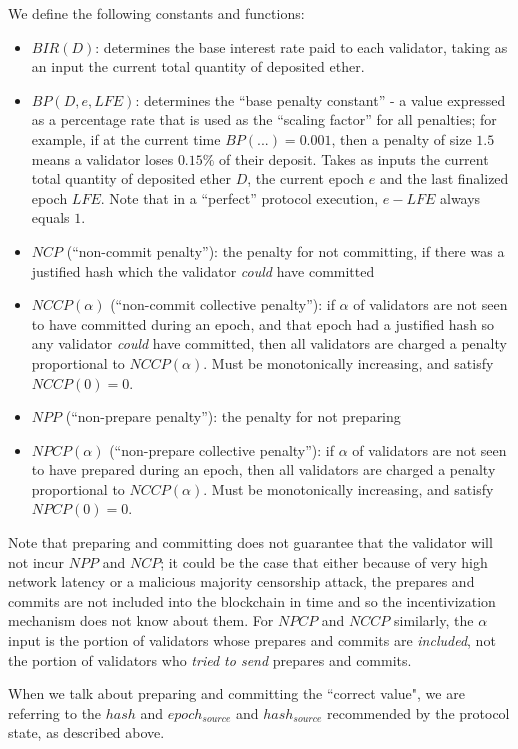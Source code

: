 \documentclass[12pt]{article}
\begin{document}
We define the following constants and functions:

\begin{itemize}
\item $BIR(D)$: determines the base interest rate paid to each validator, taking as an input the current total quantity of deposited ether.
\item $BP(D, e, LFE)$: determines the ``base penalty constant'' - a value expressed as a percentage rate that is used as the ``scaling factor'' for all penalties; for example, if at the current time $BP(...) = 0.001$, then a penalty of size $1.5$ means a validator loses $0.15\%$ of their deposit. Takes as inputs the current total quantity of deposited ether $D$, the current epoch $e$ and the last finalized epoch $LFE$. Note that in a ``perfect'' protocol execution, $e - LFE$ always equals $1$.
\item $NCP$ (``non-commit penalty''): the penalty for not committing, if there was a justified hash which the validator \textit{could} have committed
\item $NCCP(\alpha)$ (``non-commit collective penalty''): if $\alpha$ of validators are not seen to have committed during an epoch, and that epoch had a justified hash so any validator \textit{could} have committed, then all validators are charged a penalty proportional to $NCCP(\alpha)$. Must be monotonically increasing, and satisfy $NCCP(0) = 0$.
\item $NPP$ (``non-prepare penalty''): the penalty for not preparing
\item $NPCP(\alpha)$ (``non-prepare collective penalty''): if $\alpha$ of validators are not seen to have prepared during an epoch, then all validators are charged a penalty proportional to $NCCP(\alpha)$. Must be monotonically increasing, and satisfy $NPCP(0) = 0$.
\end{itemize}

Note that preparing and committing does not guarantee that the validator will not incur $NPP$ and $NCP$; it could be the case that either because of very high network latency or a malicious majority censorship attack, the prepares and commits are not included into the blockchain in time and so the incentivization mechanism does not know about them. For $NPCP$ and $NCCP$ similarly, the $\alpha$ input is the portion of validators whose prepares and commits are \textit{included}, not the portion of validators who \textit{tried to send} prepares and commits. 

When we talk about preparing and committing the ``correct value", we are referring to the $hash$ and $epoch_{source}$ and $hash_{source}$ recommended by the protocol state, as described above.
\end{document}
